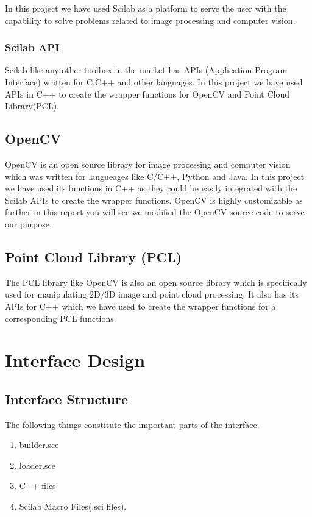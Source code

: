 \documentclass[12pt]{report}
\begin{document}
In this project we have used Scilab as a platform to serve the user with the capability to solve
problems related to image processing and computer vision.

\subsection{Scilab API}
Scilab\cite{scilab} like any other toolbox in the market has APIs (Application Program Interface) written for C,C++ and other languages.
In this project we have used APIs in C++ to create the wrapper functions for OpenCV and Point Cloud Library(PCL). 

\section{OpenCV}
\justify
OpenCV\cite{opencv} is an open source library for image processing and computer vision which was written
for langueages like C/C++, Python and Java.
\justify
In this project we have used its functions in C++ as they could be easily integrated with the Scilab APIs to 
create the wrapper functions.
\justify
OpenCV is highly customizable as further in this report you will see we modified the OpenCV source code to serve 
our purpose.

\section{Point Cloud Library (PCL)}
The PCL\cite{pcl} library like OpenCV is also an open source library which is specifically used for manipulating 2D/3D image
and point cloud processing.
\justify
It also has its APIs for C++ which we have used to create the wrapper functions for a corresponding PCL 
functions.


\chapter{Interface Design}

\section{Interface Structure}
The following things constitute the important parts of the interface.
\begin{enumerate}
	\item builder.sce
	\item loader.sce
	\item C++ files
    \item Scilab Macro Files(.sci files).	
\end{enumerate}
\end{document}
